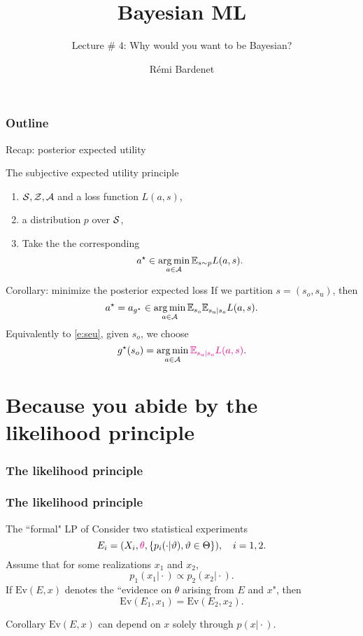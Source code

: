 \documentclass[10pt]{beamer}
\title[Bayesian ML]{Bayesian ML}
\subtitle{Lecture \# 4: Why would you want to be Bayesian?}
\author[Rémi Bardenet (CNRS \& Univ. Lille)] %
{Rémi Bardenet}
\institute[] %
{
  CNRS \& CRIStAL, Univ. Lille, France\\
  \url{http://rbardenet.github.io}\\
\vspace{1cm}
}
\date{}
\begin{document}
\begin{frame}
\maketitle
\end{frame}

\begin{frame}
\frametitle{Outline}
\tableofcontents
\end{frame}

\begin{frame}{Recap: posterior expected utility}
  \begin{block}{The subjective expected utility principle}
  \begin{enumerate}
  \item {} $\mathcal{S}, \mathcal{Z}, \mathcal{A}$ and a loss function $L(a,s)$,
  \item {} a distribution $p$ over $\mathcal{S}$,
  \item Take the the corresponding 
  \begin{equation}
  a^\star \in \operatorname*{arg\,min}_{a\in\mathcal{A}} \mathbb{E}_{s\sim p} L(a,s).
  \label{e:seu}
  \end{equation}
  \end{enumerate}
  \end{block}
  \vfill

  \begin{block}{Corollary: minimize the posterior expected loss}
  If we partition $s=(s_{o}, s_{\text{u}})$, then
  $$ a^\star = a_{g^\star} \in \operatorname*{arg\,min}_{a\in\mathcal{A}} \mathbb{E}_{s_{o}} \mathbb{E}_{s_{\text{u}}\vert s_{o}} L(a,s).$$
  Equivalently to \eqref{e:seu}, given $s_o$, we choose
  $$
  g^\star(s_o) = \operatorname*{arg\,min}_{a\in\mathcal{A}} \textcolor{magenta}{\mathbb{E}_{s_{\text{u}}\vert s_{o}} L(a,s)}.$$
  \end{block}
\end{frame}

\section{Because you abide by the likelihood principle}
\begin{frame}
  \frametitle{The likelihood principle \citep{BeWo88}}
\end{frame}  

\begin{frame}
\frametitle{The likelihood principle \citep{BeWo88}}
\begin{block}{The ``formal" LP of \cite{BeWo88}}
  Consider two statistical experiments
  $$
  E_i=(X_i,\textcolor{magenta}{\theta}, \{p_i(\cdot\vert\vartheta), \vartheta\in\Theta\}), \quad i=1,2.
  $$
  Assume that for some realizations $x_1$ and $x_2$,
  $$
  p_1(x_1\vert\cdot) \propto p_2(x_2\vert \cdot).
  $$
  If $\text{Ev}(E,x)$ denotes the ``evidence on $\theta$ arising from $E$ and $x$", then
  $$
  \text{Ev}(E_1,x_1) = \text{Ev}(E_2,x_2).
  $$
\end{block}

\begin{exampleblock}{Corollary}
$\text{Ev}(E,x)$ can depend on $x$ solely through $p(x\vert\cdot)$.
\end{exampleblock}
\end{frame}
\end{document}
